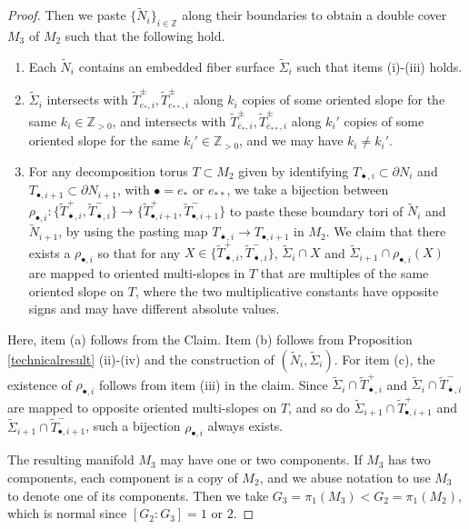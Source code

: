 \documentclass{amsart}
\numberwithin{equation}{section}
\theoremstyle{definition}
\begin{document}
\begin{proof}
Then we paste $\{\tilde{N}_i\}_{i\in \mathbb{Z}}$ along their boundaries to obtain a double cover $M_3$ of $M_2$ such that the following hold.
\begin{enumerate}
\item[(a)] Each $\tilde{N}_i$ contains an embedded fiber surface $\tilde{\Sigma}_i$ such that items (i)-(iii) holds. 
\item [(b)] $\tilde{\Sigma}_i$ intersects with $\tilde{T}_{e_*,i}^{\pm},\tilde{T}_{e_{**},i}^{\pm}$ along $k_i$ copies of some oriented slope for the same $k_i\in \mathbb{Z}_{>0}$, and intersects with $\tilde{T}_{\bar{e}_*,i}^{\pm},\tilde{T}_{\bar{e}_{**},i}^{\pm}$ along $k_i'$ copies of some oriented slope for the same $k_i'\in \mathbb{Z}_{>0}$, and we may have $k_i\ne k_i'$.
\item [(c)] For any decomposition torus $T\subset M_2$ given by identifying $T_{\bar{\bullet},i}\subset \partial N_i$ and $T_{\bullet,i+1}\subset \partial N_{i+1}$, with $\bullet=e_*$ or $e_{**}$, we take a bijection between $\rho_{\bullet,i}:\{\tilde{T}_{\bar{\bullet},i}^+,\tilde{T}_{\bar{\bullet},i}^-\}\to \{\tilde{T}_{\bullet,i+1}^+,\tilde{T}_{\bullet,i+1}^-\}$ to paste these boundary tori of $\tilde{N}_i$ and $\tilde{N}_{i+1}$, by using the pasting map $T_{\bar{\bullet},i}\to T_{\bullet,i+1}$ in $M_2$. We claim that there exists a $\rho_{\bullet,i}$ so that for any $X\in \{\tilde{T}_{\bar{\bullet},i}^+,\tilde{T}_{\bar{\bullet},i}^-\}$, $\tilde{\Sigma}_i\cap X$ and $\tilde{\Sigma}_{i+1}\cap \rho_{\bullet,i}(X)$ are mapped to oriented multi-slopes in $T$ that are multiples of the same oriented slope on $T$, where the two multiplicative constants have opposite signs and may have different absolute values.
\end{enumerate}

Here, item (a) follows from the Claim. Item (b) follows from Proposition \ref{technicalresult} (ii)-(iv) and the construction of $(\tilde{N}_i,\tilde{\Sigma}_i)$. For item (c), the existence of $\rho_{\bullet,i}$ follows from item (iii) in the claim. Since $\tilde{\Sigma}_i\cap \tilde{T}_{\bar{\bullet},i}^+$ and $\tilde{\Sigma}_i\cap\tilde{T}_{\bar{\bullet},i}^-$ are mapped to opposite oriented multi-slopes on $T$, and so do $\tilde{\Sigma}_{i+1}\cap \tilde{T}_{\bullet,i+1}^+$ and $\tilde{\Sigma}_{i+1}\cap\tilde{T}_{\bullet,i+1}^-$, such a bijection $\rho_{\bullet,i}$ always exists.

The resulting manifold $M_3$ may have one or two components. If $M_3$ has two components, each component is a copy of $M_2$, and we abuse notation to use $M_3$ to denote one of its components. Then we take $G_3=\pi_1(M_3)<G_2=\pi_1(M_2)$, which is normal since $[G_2:G_3]=1$ or $2$.



\end{proof}
\end{document}
